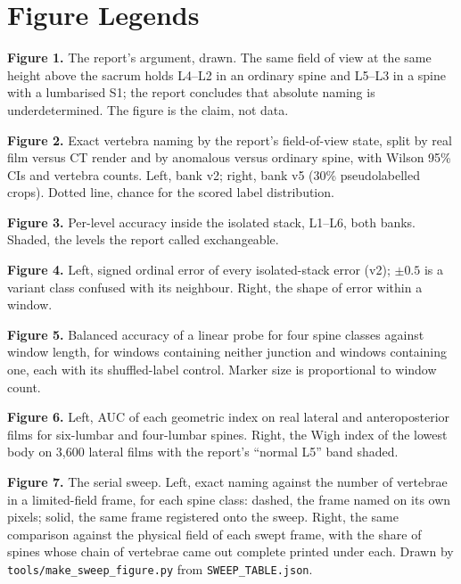 \documentclass[11pt,letterpaper]{article}
\begin{document}
\section*{Figure Legends}
\noindent\textbf{Figure 1.} The report's argument, drawn. The same field of view at the same height above the sacrum holds L4--L2 in an ordinary spine and L5--L3 in a spine with a lumbarised S1; the report concludes that absolute naming is underdetermined. The figure is the claim, not data.

\noindent\textbf{Figure 2.} Exact vertebra naming by the report's field-of-view state, split by real film versus CT render and by anomalous versus ordinary spine, with Wilson 95\% CIs and vertebra counts. Left, bank v2; right, bank v5 (30\% pseudolabelled crops). Dotted line, chance for the scored label distribution.

\noindent\textbf{Figure 3.} Per-level accuracy inside the isolated stack, L1--L6, both banks. Shaded, the levels the report called exchangeable.

\noindent\textbf{Figure 4.} Left, signed ordinal error of every isolated-stack error (v2); $\pm0.5$ is a variant class confused with its neighbour. Right, the shape of error within a window.

\noindent\textbf{Figure 5.} Balanced accuracy of a linear probe for four spine classes against window length, for windows containing neither junction and windows containing one, each with its shuffled-label control. Marker size is proportional to window count.

\noindent\textbf{Figure 6.} Left, AUC of each geometric index on real lateral and anteroposterior films for six-lumbar and four-lumbar spines. Right, the Wigh index of the lowest body on 3,600 lateral films with the report's ``normal L5'' band shaded.

\noindent\textbf{Figure 7.} The serial sweep. Left, exact naming against the number of vertebrae in a limited-field frame, for each spine class: dashed, the frame named on its own pixels; solid, the same frame registered onto the sweep. Right, the same comparison against the physical field of each swept frame, with the share of spines whose chain of vertebrae came out complete printed under each. Drawn by \texttt{tools/make\_sweep\_figure.py} from \texttt{SWEEP\_TABLE.json}.

\medskip


\clearpage



\end{document}
